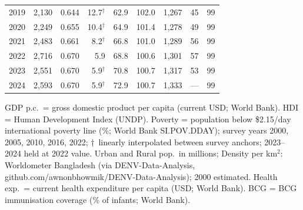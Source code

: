 \begin{table}[htbp]
{\begin{tabular}{lrrrrrrrr}
2019 & 2,130 & 0.644 & 12.7$^\dagger$ & 62.9 & 102.0 & 1,267 & 45 & 99 \\
2020 & 2,249 & 0.655 & 10.4$^\dagger$ & 64.9 & 101.4 & 1,278 & 49 & 99 \\
2021 & 2,483 & 0.661 & 8.2$^\dagger$ & 66.8 & 101.0 & 1,289 & 56 & 99 \\
2022 & 2,716 & 0.670 & 5.9 & 68.8 & 100.6 & 1,301 & 57 & 99 \\
2023 & 2,551 & 0.670 & 5.9$^\dagger$ & 70.8 & 100.7 & 1,317 & 53 & 99 \\
2024 & 2,593 & 0.670 & 5.9$^\dagger$ & 72.9 & 100.7 & 1,333 & --- & 99 \\
\bottomrule
\end{tabular}
}
\par\smallskip
\raggedright\footnotesize GDP p.c.\ = gross domestic product per capita (current USD; World Bank). HDI = Human Development Index (UNDP). Poverty = population below \$2.15/day international poverty line (\%; World Bank SI.POV.DDAY); survey years 2000, 2005, 2010, 2016, 2022; $\dagger$~linearly interpolated between survey anchors; 2023--2024 held at 2022 value. Urban and Rural pop.\ in millions; Density per km$^2$: Worldometer Bangladesh (via DENV-Data-Analysis, github.com/awnonbhowmik/DENV-Data-Analysis); 2000 estimated. Health exp.\ = current health expenditure per capita (USD; World Bank). BCG = BCG immunisation coverage (\% of infants; World Bank).
\end{table}
